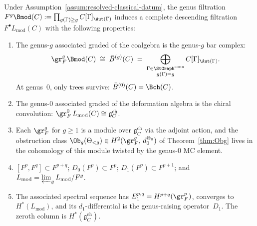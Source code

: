 \begin{theorem}
\label{thm:genus-completion}
Under Assumption~\ref{assum:resolved-classical-datum}, the genus filtration
$F^g\Bmod(C) := \prod_{g(\Gamma) \ge g} C[\Gamma]_{\Aut(\Gamma)}$
induces a complete descending filtration
$F^\bullet L_{\mathrm{mod}}(C)$ with the following properties:
\begin{enumerate}[label=\textup{(\roman*)}]
\item The genus-$g$ associated graded of the coalgebra is the
 genus-$g$ bar complex:
 \[
 \gr_F^g \Bmod(C)
 \;\cong\;
 \bar{B}^{(g)}(C)
 \;=\;
 \bigoplus_{\substack{\Gamma \in \StGraph^{\mathrm{conn}} \\
 g(\Gamma) = g}}
 C[\Gamma]_{\Aut(\Gamma)}.
 \]
 At genus~$0$, only trees survive: $\bar{B}^{(0)}(C) = \Bch(C)$.

\item The genus-$0$ associated graded of the deformation algebra
 is the chiral convolution:
 $\gr_F^0\, L_{\mathrm{mod}}(C) \cong
 \mathfrak{g}^{\mathrm{ch}}_C$.

\item Each $\gr_F^g$ for $g \ge 1$ is a module over
 $\mathfrak{g}^{\mathrm{ch}}_C$ via the adjoint action, and
 the obstruction class
 $\Ob_g(\Theta_{<g}) \in
 H^2(\gr_F^g,\, d_0^{\Theta_0})$
 of Theorem~\textup{\ref{thm:Obg}} lives in the
 cohomology of this module twisted by the genus-$0$ MC element.

\item $[F^p, F^q] \subset F^{p+q}$;
 $D_0(F^p) \subset F^p$;
 $D_1(F^p) \subset F^{p+1}$;
 and $L_{\mathrm{mod}} = \varprojlim_g L_{\mathrm{mod}}/F^g$.

\item The associated spectral sequence has
 $E_1^{p,q} = H^{p+q}(\gr_F^p)$, converges to
 $H^*(L_{\mathrm{mod}})$, and its $d_1$-differential is the
 genus-raising operator~$D_1$. The zeroth column is
 $H^*(\mathfrak{g}^{\mathrm{ch}}_C)$.
\end{enumerate}
\end{theorem}

